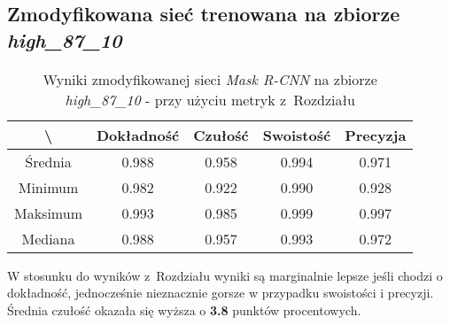 \subsection{Zmodyfikowana sieć trenowana na zbiorze \textit{high\_87\_10}}
\label{sec:results_high_modified}

\begin{table}[H]
	\centering
	\caption{Wyniki zmodyfikowanej sieci \textit{Mask R-CNN} na zbiorze \textit{high\_87\_10} - przy użyciu metryk z~Rozdziału }
	\vspace{6pt}
	{\footnotesize
		\begin{tabular}{|c|c|c|c|c|}
      \hline \textbackslash & Dokładność & Czułość & Swoistość & Precyzja \\
      \hline Średnia & 0.988 & 0.958 & 0.994 & 0.971 \\
      \hline Minimum & 0.982 & 0.922 & 0.990 & 0.928 \\
      \hline Maksimum & 0.993 & 0.985 & 0.999 & 0.997 \\
      \hline Mediana & 0.988 & 0.957 & 0.993 & 0.972 \\
      \hline
		\end{tabular}
	}
  \vspace{0pt}
  \label{Tab:high_modified_calculated}
\end{table}

W stosunku do wyników z~Rozdziału  wyniki są marginalnie lepsze jeśli chodzi o dokładność, jednocześnie nieznacznie gorsze w przypadku swoistości i precyzji. Średnia czułość okazała się wyższa o \textbf{3.8} punktów procentowych.
